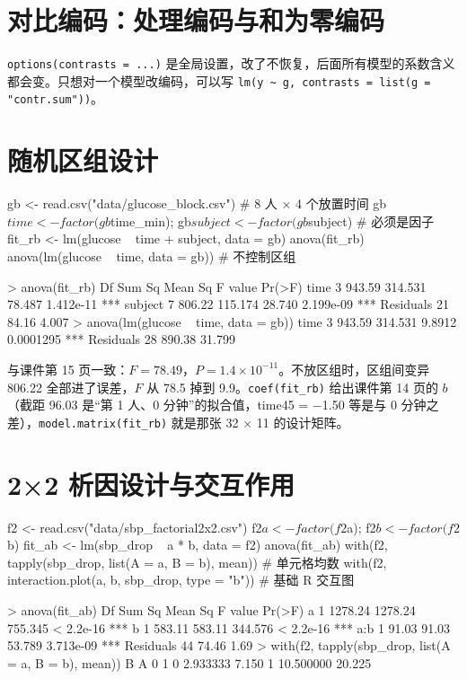 \section{对比编码：处理编码与和为零编码}
\Verb|options(contrasts = ...)| 是全局设置，改了不恢复，后面所有模型的系数含义都会变。只想对一个模型改编码，可以写 \Verb|lm(y ~ g, contrasts = list(g = "contr.sum"))|。

\section{随机区组设计}
\begin{rcode}[R · 处理 + 区组]
gb <- read.csv("data/glucose_block.csv")      # 8 人 × 4 个放置时间
gb$time <- factor(gb$time_min); gb$subject <- factor(gb$subject)   # 必须是因子
fit_rb <- lm(glucose ~ time + subject, data = gb)
anova(fit_rb)
anova(lm(glucose ~ time, data = gb))          # 不控制区组
\end{rcode}
\begin{routput}
> anova(fit_rb)
          Df Sum Sq Mean Sq F value    Pr(>F)
time       3 943.59 314.531  78.487 1.412e-11 ***
subject    7 806.22 115.174  28.740 2.199e-09 ***
Residuals 21  84.16   4.007
> anova(lm(glucose ~ time, data = gb))
time       3 943.59 314.531  9.8912 0.0001295 ***
Residuals 28 890.38  31.799
\end{routput}
与课件第 15 页一致：$F=78.49$，$P=1.4^{-11}$。不放区组时，区组间变异 806.22 全部进了误差，$F$ 从 78.5 掉到 9.9。\Verb|coef(fit_rb)| 给出课件第 14 页的 $b$（截距 96.03 是“第 1 人、0 分钟”的拟合值，time45 = −1.50 等是与 0 分钟之差），\Verb|model.matrix(fit_rb)| 就是那张 32 × 11 的设计矩阵。

\section{2×2 析因设计与交互作用}
\begin{rcode}
f2 <- read.csv("data/sbp_factorial2x2.csv")
f2$a <- factor(f2$a); f2$b <- factor(f2$b)
fit_ab <- lm(sbp_drop ~ a * b, data = f2)
anova(fit_ab)
with(f2, tapply(sbp_drop, list(A = a, B = b), mean))      # 单元格均数
with(f2, interaction.plot(a, b, sbp_drop, type = "b"))    # 基础 R 交互图
\end{rcode}
\begin{routput}
> anova(fit_ab)
          Df  Sum Sq Mean Sq F value    Pr(>F)
a          1 1278.24 1278.24 755.345 < 2.2e-16 ***
b          1  583.11  583.11 344.576 < 2.2e-16 ***
a:b        1   91.03   91.03  53.789 3.713e-09 ***
Residuals 44   74.46    1.69
> with(f2, tapply(sbp_drop, list(A = a, B = b), mean))
   B
A           0      1
  0  2.933333  7.150
  1 10.500000 20.225
\end{routput}


